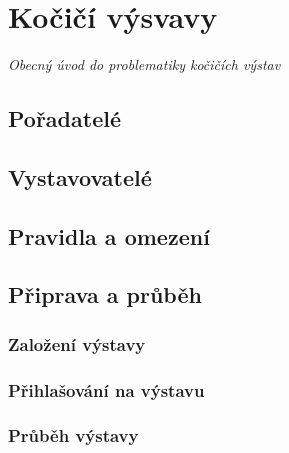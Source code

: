 \chapter{Kočičí výsvavy}
\textit{Obecný úvod do problematiky kočičích výstav}
\section{Pořadatelé}
\section{Vystavovatelé}

\section{Pravidla a omezení}
\section{Připrava a průběh}
\subsection{Založení výstavy}
\subsection{Přihlašování na výstavu}
\subsection{Průběh výstavy}




